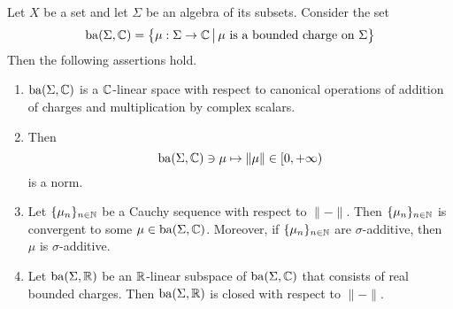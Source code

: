 \begin{theorem}\label{theorem:space_of_bounded_complex_charges}
    Let $X$ be a set and let $\Sigma$ be an algebra of its subsets. Consider the set
    $$\mathrm{ba}(\Sigma, {\mathbb C}) = \big\{\mu:\Sigma \rightarrow {\mathbb C}\,\big|\,\mu\mbox{ is a bounded charge on }\Sigma\big\}$$
    Then the following assertions hold.
    \begin{enumerate}[label=\emph{\textbf{(\arabic*)}}, leftmargin=*]
        \item $\mathrm{ba}(\Sigma, {\mathbb C})$ is a ${\mathbb C}$-linear space with respect to canonical operations of addition of charges and multiplication by complex scalars.
        \item Then
              $$\mathrm{ba}(\Sigma, {\mathbb C}) \ni \mu \mapsto \lVert \mu\rVert \in [0,+\infty)$$
              is a norm.
        \item Let $\{\mu_n\}_{n\in {\mathbb N}}$ be a Cauchy sequence with respect to $\lVert-\rVert$. Then $\{\mu_n\}_{n\in {\mathbb N}}$ is convergent to some $\mu \in \mathrm{ba}(\Sigma, {\mathbb C})$. Moreover, if $\{\mu_n\}_{n\in {\mathbb N}}$ are $\sigma$-additive, then $\mu$ is $\sigma$-additive.
        \item Let $\mathrm{ba}(\Sigma,{\mathbb R})$ be an ${\mathbb R}$-linear subspace of $\mathrm{ba}(\Sigma, {\mathbb C})$ that consists of real bounded charges. Then $\mathrm{ba}(\Sigma,{\mathbb R})$ is closed with respect to $\lVert-\rVert$.
    \end{enumerate}
\end{theorem}

